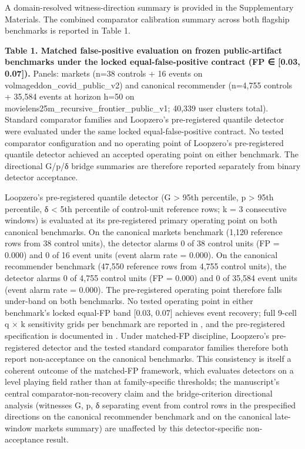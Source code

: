 \documentclass[
  11pt,
]{article}
\begin{document}
A domain-resolved witness-direction summary is provided in the
Supplementary Materials. The combined comparator calibration summary
across both flagship benchmarks is reported in Table 1.

\textbf{Table 1. Matched false-positive evaluation on frozen
public-artifact benchmarks under the locked equal-false-positive
contract (FP ∈ {[}0.03, 0.07{]}).} Panels: markets (n=38 controls + 16
events on volmageddon\_covid\_public\_v2) and canonical recommender
(n=4,755 controls + 35,584 events at horizon h=50 on
movielens25m\_recursive\_frontier\_public\_v1; 40,339 user clusters
total). Standard comparator families and Loopzero's pre-registered
quantile detector were evaluated under the same locked
equal-false-positive contract. No tested comparator configuration and no
operating point of Loopzero's pre-registered quantile detector achieved
an accepted operating point on either benchmark. The directional G/p/δ
bridge summaries are therefore reported separately from binary detector
acceptance.

Loopzero's pre-registered quantile detector (G \textgreater{} 95th
percentile, p \textgreater{} 95th percentile, δ \textless{} 5th
percentile of control-unit reference rows; k = 3 consecutive windows) is
evaluated at its pre-registered primary operating point on both
canonical benchmarks. On the canonical markets benchmark (1,120
reference rows from 38 control units), the detector alarms 0 of 38
control units (FP = 0.000) and 0 of 16 event units (event alarm rate =
0.000). On the canonical recommender benchmark (47,550 reference rows
from 4,755 control units), the detector alarms 0 of 4,755 control units
(FP = 0.000) and 0 of 35,584 event units (event alarm rate = 0.000). The
pre-registered operating point therefore falls under-band on both
benchmarks. No tested operating point in either benchmark's locked
equal-FP band {[}0.03, 0.07{]} achieves event recovery; full 9-cell q ×
k sensitivity grids per benchmark are reported in
\texttt{}, and
the pre-registered specification is documented in
\texttt{}. Under matched-FP discipline,
Loopzero's pre-registered detector and the tested standard comparator
families therefore both report non-acceptance on the canonical
benchmarks. This consistency is itself a coherent outcome of the
matched-FP framework, which evaluates detectors on a level playing field
rather than at family-specific thresholds; the manuscript's central
comparator-non-recovery claim and the bridge-criterion directional
analysis (witnesses G, p, δ separating event from control rows in the
prespecified directions on the canonical recommender benchmark and on
the canonical late-window markets summary) are unaffected by this
detector-specific non-acceptance result.
\end{document}
